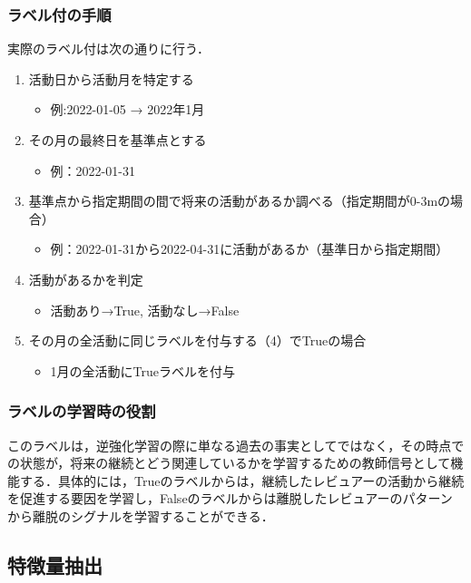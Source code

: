 \documentclass[submit,techrep,noauthor]{ipsj}
\begin{document}
\subsubsection{ラベル付の手順}
実際のラベル付は次の通りに行う．
\begin{enumerate}
    \item 活動日から活動月を特定する
    \begin{itemize}
        \item 例:2022-01-05 → 2022年1月
    \end{itemize}
    \item その月の最終日を基準点とする
    \begin{itemize}
        \item 例：2022-01-31
    \end{itemize}
    \item 基準点から指定期間の間で将来の活動があるか調べる（指定期間が0-3mの場合）
    \begin{itemize}
        \item 例：2022-01-31から2022-04-31に活動があるか（基準日から指定期間）
    \end{itemize}
    \item 活動があるかを判定
    \begin{itemize}
        \item 活動あり→True, 活動なし→False
    \end{itemize}
        \item その月の全活動に同じラベルを付与する（4）でTrueの場合
    \begin{itemize}
        \item 1月の全活動にTrueラベルを付与
    \end{itemize}
\end{enumerate}

\subsubsection{ラベルの学習時の役割}
このラベルは，逆強化学習の際に単なる過去の事実としてではなく，その時点での状態が，将来の継続とどう関連しているかを学習するための教師信号として機能する．具体的には，Trueのラベルからは，継続したレビュアーの活動から継続を促進する要因を学習し，Falseのラベルからは離脱したレビュアーのパターンから離脱のシグナルを学習することができる．

\subsection{特徴量抽出}
\end{document}
